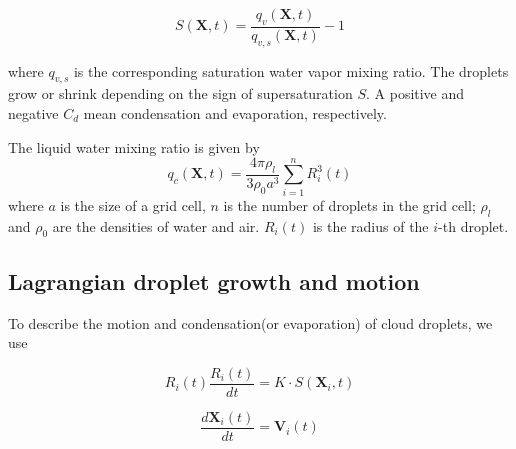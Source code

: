 \documentclass[draft,jgrga]{AGUTeX}
\begin{document}
\begin{article}
\begin{subequations}
\begin{equation}
S(\mathbf{X},t)=\frac{q_{v}(\mathbf{X},t)}{q_{v,s}(\mathbf{X},t)}-1\label{eq:Supersat}
\end{equation}

\end{subequations}

where $q_{v,s}$ is the corresponding saturation water vapor mixing ratio. The droplets 
grow or shrink depending on the sign of supersaturation $S$. A positive and negative 
$C_d$ mean condensation and evaporation, respectively.

The liquid water mixing ratio is given by
\begin{equation}
q_{c}(\mathbf{X},t)=\frac{4\pi\rho_{l}}{3\rho_{0}a^{3}}\sum_{i=1}^{n}R_{i}^{3}(t)\label{eq:cloud_water}
\end{equation}
where $a$ is the size of a grid cell, $n$ is the number of droplets
in the grid cell; $\rho_{l}$ and $\rho_{0}$ are the densities of water 
and air. $R_{i}(t)$ is the radius of the $i$-th droplet.



\subsection{Lagrangian droplet growth and motion}

To describe the motion and condensation(or evaporation) of cloud droplets, we use

\begin{equation}
R_i(t)\frac{R_i(t)}{dt}=K\cdot S(\mathbf{X}_i,t)\label{eq:Radius}
\end{equation}


\begin{equation}
\frac{d\mathbf{X}_i(t)}{dt}=\mathbf{V}_i(t)\label{eq:Coords}
\end{equation}



\end{article}
\end{document}
